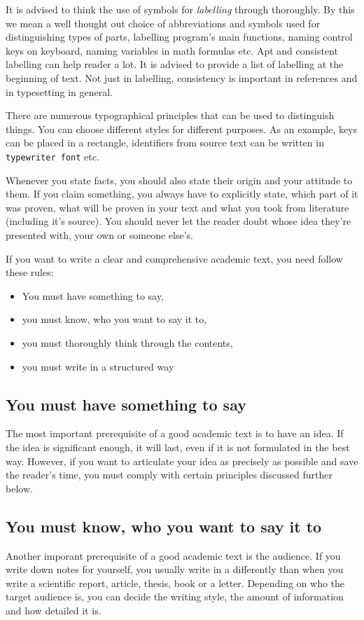 It is advised to think the use of symbols for {\it labelling} through thoroughly. By this we mean a well thought out choice of abbreviations and symbols used for distinguishing types of parts, labelling program's main functions, naming control keys on keyboard, naming variables in math formulas etc. Apt and consistent labelling can help reader a lot. It is advised to provide a list of labelling at the beginning of text. Not just in labelling, consistency is important in references and in typesetting in general.

There are numerous typographical principles that can be used to distinguish things. You can choose different styles for different purposes. As an example, keys can be placed in a rectangle, identifiers from source text can be written in {\tt typewriter font} etc.

Whenever you state facts, you should also state their origin and your attitude to them. If you claim something, you always have to explicitly state, which part of it was proven, what will be proven in your text and what you took from literature (including it's source). You should never let the reader doubt whose idea they're presented with, your own or someone else's.


If you want to write a clear and comprehensive academic text, you need follow these rules:
\begin{itemize}
\item You must have something to say,
\item you must know, who you want to say it to,
\item you must thoroughly think through the contents,
\item you must write in a structured way
\end{itemize}

\subsection*{You must have something to say}
The most important prerequisite of a good academic text is to have an idea. If the idea is significant enough, it will last, even if it is not formulated in the best way. However, if you want to articulate your idea as precisely as possible and save the reader's time, you must comply with certain principles discussed further below.

\subsection*{You must know, who you want to say it to}
Another imporant prerequisite of a good academic text is the audience. If you write down notes for yourself, you usually write in a differently than when you write a scientific report, article, thesis, book or a letter. Depending on who the target audience is, you can decide the writing style, the amount of information and how detailed it is.

